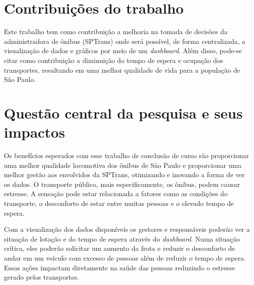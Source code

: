\section{Contribuições do trabalho}
\indent
\par Este trabalho tem como contribuição a melhoria na tomada de decisões da administradora de ônibus (SPTrans) onde será possível, de forma centralizada, a visualização de dados e gráficos por meio de um \textit{dashboard}. Além disso, pode-se citar como contribuição a diminuição do tempo de espera e ocupação dos transportes, resultando em uma melhor qualidade de vida para a população de São Paulo.

\section{Questão central da pesquisa e seus impactos}
\indent
\par Os benefícios esperados com esse trabalho de conclusão de curso são proporcionar uma melhor qualidade locomotiva dos ônibus de São Paulo e proporcionar uma melhor gestão aos envolvidos da SPTrans, otimizando e inovando a forma de ver os dados. O transporte público, mais especificamente, os ônibus, podem causar estresse. A sensação pode estar relacionada a fatores como as condições do transporte, o desconforto de estar entre muitas pessoas e o elevado tempo de espera.
\par Com a visualização dos dados disponíveis os gestores e responsáveis poderão ver a situação de lotação e do tempo de espera através do \textit{dashboard}. Numa situação crítica, eles poderão solicitar um aumento da frota e reduzir o desconforto de andar em um veículo com excesso de pessoas além de reduzir o tempo de espera. Essas ações impactam diretamente na saúde das pessoas reduzindo o estresse gerado pelos transportes.
